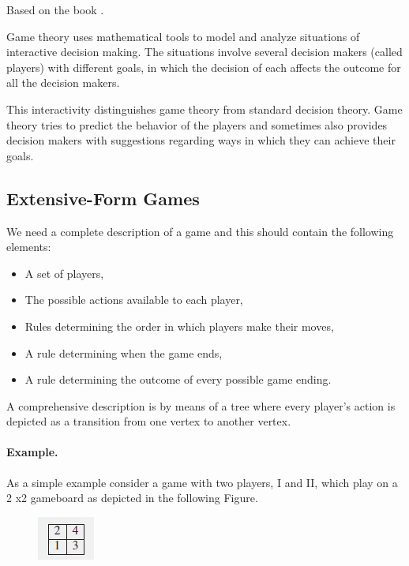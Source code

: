 
Based on the book \cite{Maschler2013}.

Game theory uses mathematical tools to model and analyze situations of interactive decision making. The situations involve several decision makers (called players) with different goals, in which the decision of each affects the outcome for all the decision makers.

This interactivity distinguishes game theory from standard decision theory. Game theory tries to predict the behavior of the players and sometimes also provides decision makers with suggestions regarding ways in which they can achieve their goals.

\subsection{Extensive-Form Games}

We need a complete description of a game and this should contain the following elements:

\begin{itemize}
\item A set of players,
\item The possible actions available to each player,
\item Rules determining the order in which players make their moves,
\item A rule determining when the game ends,
\item A rule determining the outcome of every possible game ending.
\end{itemize}

A comprehensive description is by means of a tree where every player’s action is depicted as a transition from one vertex to another vertex.

\paragraph{Example.} As a simple example consider a game with two players, I and II, which play on a 2 x2 gameboard as depicted in the following Figure.

\begin{figure}[H]
    \centering
    \includegraphics[scale=1.2]{images/2023-10-10-game_theory_01.png}
\end{figure}

